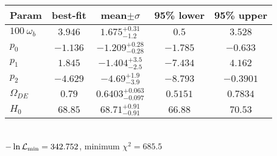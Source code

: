 \begin{tabular}{|l|c|c|c|c|} 
 \hline 
Param & best-fit & mean$\pm\sigma$ & 95\% lower & 95\% upper \\ \hline 
$100~\omega_{b }$ &$3.946$ & $1.675_{-1.2}^{+0.31}$ & $0.5$ & $3.528$ \\ 
$p_{0 }$ &$-1.136$ & $-1.209_{-0.28}^{+0.28}$ & $-1.785$ & $-0.633$ \\ 
$p_{1 }$ &$1.845$ & $-1.404_{-2.5}^{+3.5}$ & $-7.434$ & $4.162$ \\ 
$p_{2 }$ &$-4.629$ & $-4.69_{-3.9}^{+1.9}$ & $-8.793$ & $-0.3901$ \\ 
$\Omega_{DE}$ &$0.79$ & $0.6403_{-0.097}^{+0.063}$ & $0.5151$ & $0.7834$ \\ 
$H_{0 }$ &$68.85$ & $68.71_{-0.91}^{+0.91}$ & $66.88$ & $70.53$ \\ 
\hline 
 \end{tabular} \\ 
$-\ln{\cal L}_\mathrm{min} =342.752$, minimum $\chi^2=685.5$ \\ 
